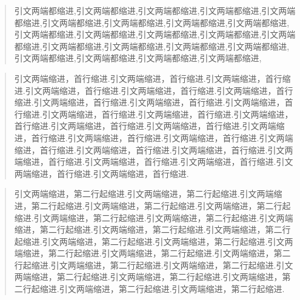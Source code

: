 \documentclass[10pt,titlepage]{report} %
\begin{document}
\author{QuietHeart} %

\begin{quote}
引文两端都缩进,引文两端都缩进,引文两端都缩进,引文两端都缩进,引文两端都缩进,引文两端都缩进,引文两端都缩进,引文两端都缩进,引文两端都缩进,引文两端都缩进,引文两端都缩进,引文两端都缩进,引文两端都缩进,引文两端都缩进,引文两端都缩进,引文两端都缩进,引文两端都缩进,引文两端都缩进,引文两端都缩进,引文两端都缩进,引文两端都缩进,引文两端都缩进,
\end{quote}

\begin{quotation}%
引文两端缩进，首行缩进.引文两端缩进，首行缩进.引文两端缩进，首行缩进.引文两端缩进，首行缩进.引文两端缩进，首行缩进.引文两端缩进，首行缩进.引文两端缩进，首行缩进.引文两端缩进，首行缩进.引文两端缩进，首行缩进.引文两端缩进，首行缩进.引文两端缩进，首行缩进.引文两端缩进，首行缩进.引文两端缩进，首行缩进.引文两端缩进，首行缩进.引文两端缩进，首行缩进.引文两端缩进，首行缩进.引文两端缩进，首行缩进.引文两端缩进，首行缩进.引文两端缩进，首行缩进.引文两端缩进，首行缩进.引文两端缩进，首行缩进.引文两端缩进，首行缩进.引文两端缩进，首行缩进.引文两端缩进，首行缩进.引文两端缩进，首行缩进.
\end{quotation}

\begin{verse}
引文两端缩进，第二行起缩进.引文两端缩进，第二行起缩进.引文两端缩进，第二行起缩进.引文两端缩进，第二行起缩进.引文两端缩进，第二行起缩进.引文两端缩进，第二行起缩进.引文两端缩进，第二行起缩进.引文两端缩进，第二行起缩进.引文两端缩进，第二行起缩进.引文两端缩进，第二行起缩进.引文两端缩进，第二行起缩进.引文两端缩进，第二行起缩进.引文两端缩进，第二行起缩进.引文两端缩进，第二行起缩进.引文两端缩进，第二行起缩进.引文两端缩进，第二行起缩进.引文两端缩进，第二行起缩进.引文两端缩进，第二行起缩进.引文两端缩进，第二行起缩进.引文两端缩进，第二行起缩进.引文两端缩进，第二行起缩进.引文两端缩进，第二行起缩进.
\end{verse}
\end{document}

